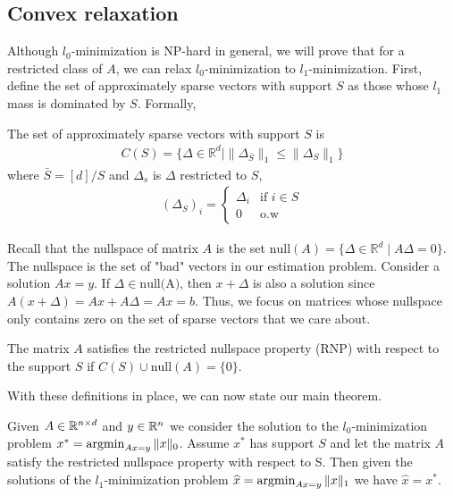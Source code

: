 \subsection{Convex relaxation}
Although $l_0$-minimization is NP-hard in general, we will prove that for a restricted class of $A$, we can relax $l_0$-minimization to $l_1$-minimization. First, define the set of approximately sparse vectors with support $S$ as those whose $l_1$ mass is dominated by $S$. Formally,
\begin{definition}
The set of approximately sparse vectors with support $S$ is
\begin{align*}
    C(S) = \{ \Delta \in \mathbb{R}^{d} \mid \|\Delta_{\bar{S}}\|_1 \leq \|\Delta_S \|_1 \}
\end{align*}
where $\bar{S} = [d] / S$ and $\Delta_s$ is $\Delta$ restricted to $S$,
\begin{align*}
    (\Delta_{S})_i = \begin{cases}
        \Delta_i & \text{if } i \in S \\
        0 & \text{o.w}
    \end{cases}
\end{align*}
\end{definition}
Recall that the nullspace of matrix $A$ is the set $\text{null} (A) = \{ \Delta \in \mathbb{R}^{d} \mid A\Delta = 0 \}$. The nullspace is the set of "bad" vectors in our estimation problem. Consider a solution $Ax = y$. If $\Delta \in \text{null(A)}$, then $x + \Delta$ is also a solution since $A(x + \Delta) = Ax + A\Delta = Ax = b$. Thus, we focus on matrices whose nullspace only contains zero on the set of sparse vectors that we care about.
\begin{definition}
The matrix $A$ satisfies the restricted nullspace property (RNP) with respect to the support $S$ if $C(S) \cup \text{null}(A) = \{ 0 \}$.
\end{definition}
With these definitions in place, we can now state our main theorem.
\begin{theorem}
Given $A \in \mathbb{R}^{n \times d}$ and $y \in \mathbb{R}^n$ we consider the solution to the $l_0$-minimization problem $x^* = \mathop{\rm argmin}_{Ax=y}\|x\|_0$. Assume $x^*$ has support $S$ and let the matrix $A$ satisfy the restricted nullspace property with respect to S. Then given the solutions of the $l_1$-minimization problem $\widehat{x} = \mathop{\rm argmin}_{Ax=y}\|x\|_1$ we have $\hat{x} = x^*$.
\end{theorem}

